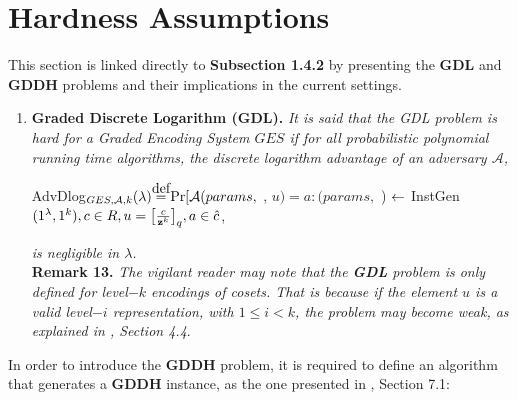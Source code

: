 \section{Hardness Assumptions}

This section is linked directly to \textbf{Subsection 1.4.2} by presenting the \textbf{GDL} and \textbf{GDDH} problems and their implications in the current settings.

\begin{enumerate}
	\item \textbf{Graded Discrete Logarithm (GDL).} \textit{It is said that the GDL problem is hard for a Graded Encoding System $GES$ if for all probabilistic polynomial running time algorithms, the discrete logarithm advantage of an adversary $\mathcal{A}$,}
	
	\begin{center}
		AdvDlog$_{GES, \mathcal{A}, k}(\lambda) \stackrel{\mathclap{\normalfont\mbox{def}}}{=} \Pr[\mathcal{A}(params,$ {\pzt}, $u) = a : (params, $ {\pzt}) $\leftarrow$ InstGen$(1^\lambda, 1^k), c \in R, u = \big[ \frac{c}{\textbf{z}^k} \big]_q, a\in \hat{c} $,
	\end{center}
	
	\textit{is negligible in $\lambda$.}\\
	
	\textbf{Remark 13.} \textit{The vigilant reader may note that the \textbf{GDL} problem is only defined for level$-k$ encodings of cosets. That is because if the element $u$ is a valid level$-i$ representation, with $1 \leq i < k$, the problem may become weak, as explained in \cite{GGH13}, Section 4.4}.

\end{enumerate}
	
In order to introduce the \textbf{GDDH} problem, it is required to define an algorithm that generates a \textbf{GDDH} instance, as the one presented in \cite{Gar15}, Section 7.1:\\

